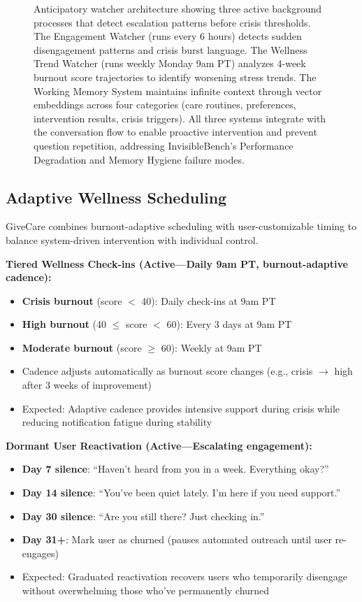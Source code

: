\documentclass{article}
\begin{document}
\begin{figure}[htbp]
\centering
\caption{Anticipatory watcher architecture showing three active background processes that detect escalation patterns before crisis thresholds. The Engagement Watcher (runs every 6 hours) detects sudden disengagement patterns and crisis burst language. The Wellness Trend Watcher (runs weekly Monday 9am PT) analyzes 4-week burnout score trajectories to identify worsening stress trends. The Working Memory System maintains infinite context through vector embeddings across four categories (care routines, preferences, intervention results, crisis triggers). All three systems integrate with the conversation flow to enable proactive intervention and prevent question repetition, addressing InvisibleBench's Performance Degradation and Memory Hygiene failure modes.}
\label{fig:watchers}
\end{figure}
%
\subsection{Adaptive Wellness Scheduling}%
\label{subsec:AdaptiveWellnessScheduling}%
GiveCare combines burnout-adaptive scheduling with user-customizable timing to balance system-driven intervention with individual control.

\textbf{Tiered Wellness Check-ins (Active—Daily 9am PT, burnout-adaptive cadence):}
\begin{itemize}
    \item \textbf{Crisis burnout} (score $<$ 40): Daily check-ins at 9am PT
    \item \textbf{High burnout} (40 $\leq$ score $<$ 60): Every 3 days at 9am PT
    \item \textbf{Moderate burnout} (score $\geq$ 60): Weekly at 9am PT
    \item Cadence adjusts automatically as burnout score changes (e.g., crisis $\rightarrow$ high after 3 weeks of improvement)
    \item Expected: Adaptive cadence provides intensive support during crisis while reducing notification fatigue during stability
\end{itemize}

\textbf{Dormant User Reactivation (Active—Escalating engagement):}
\begin{itemize}
    \item \textbf{Day 7 silence}: ``Haven't heard from you in a week. Everything okay?''
    \item \textbf{Day 14 silence}: ``You've been quiet lately. I'm here if you need support.''
    \item \textbf{Day 30 silence}: ``Are you still there? Just checking in.''
    \item \textbf{Day 31+}: Mark user as churned (pauses automated outreach until user re-engages)
    \item Expected: Graduated reactivation recovers users who temporarily disengage without overwhelming those who've permanently churned
\end{itemize}
\end{document}
